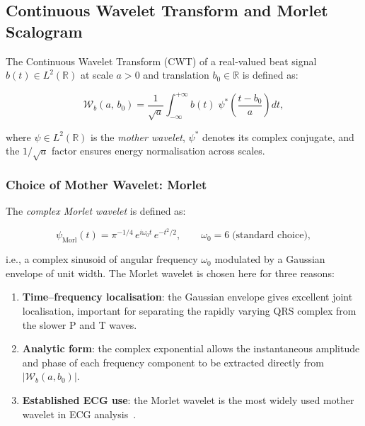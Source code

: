 \documentclass[12pt, a4paper]{article}
\newcommand{\R}{\mathbb{R}}
\newcommand{\CWT}{\mathcal{W}}
\begin{document}
\subsection{Continuous Wavelet Transform and Morlet Scalogram}

The Continuous Wavelet Transform (CWT) of a real-valued beat signal
$b(t) \in L^2(\R)$ at scale $a > 0$ and translation $b_0 \in \R$ is
defined as:

\begin{mathbox}
\begin{equation}
  \CWT_b(a,\, b_0)
  = \frac{1}{\sqrt{a}}
    \int_{-\infty}^{+\infty} b(t)\;
    \psi^*\!\!\left(\frac{t - b_0}{a}\right) dt,
  \label{eq:cwt}
\end{equation}
\end{mathbox}

\noindent where $\psi \in L^2(\R)$ is the \textit{mother wavelet},
$\psi^*$ denotes its complex conjugate, and the
$1/\sqrt{a}$ factor ensures energy normalisation across scales.

\subsubsection{Choice of Mother Wavelet: Morlet}

The \textit{complex Morlet wavelet} is defined as:

\begin{mathbox}
\begin{equation}
  \psi_{\text{Morl}}(t)
  = \pi^{-1/4}\, e^{i \omega_0 t}\, e^{-t^2/2},
  \qquad \omega_0 = 6 \; \text{(standard choice)},
  \label{eq:morlet}
\end{equation}
\end{mathbox}

\noindent i.e., a complex sinusoid of angular frequency $\omega_0$
modulated by a Gaussian envelope of unit width.
The Morlet wavelet is chosen here for three reasons:
\begin{enumerate}[leftmargin=2em, itemsep=2pt]
  \item \textbf{Time--frequency localisation}: the Gaussian envelope gives
    excellent joint localisation, important for separating the rapidly
    varying QRS complex from the slower P and T waves.
  \item \textbf{Analytic form}: the complex exponential allows the
    instantaneous amplitude and phase of each frequency component to be
    extracted directly from $|\CWT_b(a, b_0)|$.
  \item \textbf{Established ECG use}: the Morlet wavelet is the most
    widely used mother wavelet in ECG
    analysis~\cite{byeon2019, alnaji2024}.
\end{enumerate}
\end{document}
